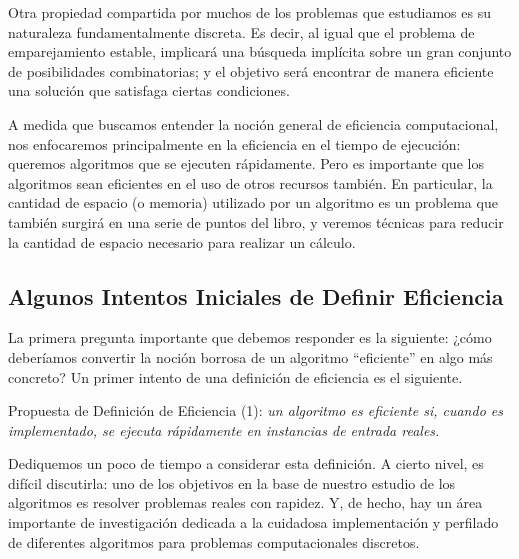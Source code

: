 \documentclass[a4paper, 12pt]{book}
\theoremstyle{dotless}
\begin{document}
Otra propiedad compartida por muchos de los problemas que estudiamos es su naturaleza fundamentalmente discreta. Es decir, al igual que el problema de emparejamiento estable, implicará una búsqueda implícita sobre un gran conjunto de posibilidades combinatorias; y el objetivo será encontrar de manera eficiente una solución que satisfaga ciertas condiciones.

A medida que buscamos entender la noción general de eficiencia computacional, nos enfocaremos principalmente en la eficiencia en el tiempo de ejecución: queremos algoritmos que se ejecuten rápidamente. Pero es importante que los algoritmos sean eficientes en el uso de otros recursos también. En particular, la cantidad de espacio (o memoria) utilizado por un algoritmo es un problema que también surgirá en una serie de puntos del libro, y veremos técnicas para reducir la cantidad de espacio necesario para realizar un cálculo.

\subsection*{Algunos Intentos Iniciales de Definir Eficiencia}

La primera pregunta importante que debemos responder es la siguiente: ¿cómo deberíamos convertir la noción borrosa de un algoritmo ``eficiente'' en algo más concreto? 
Un primer intento de una definición de eficiencia es el siguiente. 

\vspace{18pt}
Propuesta de Definición de Eficiencia (1): \textit{un algoritmo es eficiente si, cuando es implementado, se ejecuta rápidamente en instancias de entrada reales.}
\vspace{18pt}

Dediquemos un poco de tiempo a considerar esta definición. A cierto nivel, es difícil discutirla: uno de los objetivos en la base de nuestro estudio de los algoritmos es resolver problemas reales con rapidez. Y, de hecho, hay un área importante de investigación dedicada a la cuidadosa implementación y perfilado de diferentes algoritmos para problemas computacionales discretos.
\end{document}
